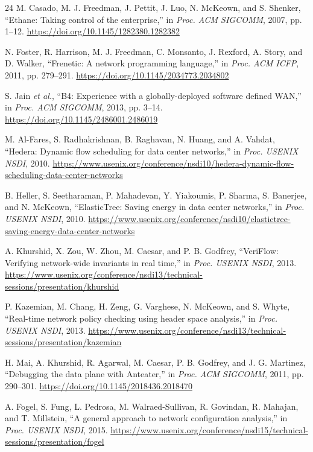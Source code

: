 \documentclass[conference]{IEEEtran}
\begin{document}
\begin{thebibliography}{24}
 M. Casado, M. J. Freedman, J. Pettit, J. Luo,
N. McKeown, and S. Shenker, ``Ethane: Taking control of the enterprise,''
in \emph{Proc. ACM SIGCOMM}, 2007, pp. 1--12.
\url{https://doi.org/10.1145/1282380.1282382}

 N. Foster, R. Harrison, M. J. Freedman,
C. Monsanto, J. Rexford, A. Story, and D. Walker, ``Frenetic: A network
programming language,'' in \emph{Proc. ACM ICFP}, 2011, pp. 279--291.
\url{https://doi.org/10.1145/2034773.2034802}

 S. Jain \emph{et al.}, ``B4: Experience with a
globally-deployed software defined WAN,'' in \emph{Proc. ACM SIGCOMM},
2013, pp. 3--14. \url{https://doi.org/10.1145/2486001.2486019}

 M. Al-Fares, S. Radhakrishnan, B. Raghavan,
N. Huang, and A. Vahdat, ``Hedera: Dynamic flow scheduling for data center
networks,'' in \emph{Proc. USENIX NSDI}, 2010.
\url{https://www.usenix.org/conference/nsdi10/hedera-dynamic-flow-scheduling-data-center-networks}

 B. Heller, S. Seetharaman, P. Mahadevan,
Y. Yiakoumis, P. Sharma, S. Banerjee, and N. McKeown, ``ElasticTree:
Saving energy in data center networks,'' in \emph{Proc. USENIX NSDI},
2010. \url{https://www.usenix.org/conference/nsdi10/elastictree-saving-energy-data-center-networks}

 A. Khurshid, X. Zou, W. Zhou, M. Caesar,
and P. B. Godfrey, ``VeriFlow: Verifying network-wide invariants in real
time,'' in \emph{Proc. USENIX NSDI}, 2013.
\url{https://www.usenix.org/conference/nsdi13/technical-sessions/presentation/khurshid}

 P. Kazemian, M. Chang, H. Zeng, G. Varghese,
N. McKeown, and S. Whyte, ``Real-time network policy checking using header
space analysis,'' in \emph{Proc. USENIX NSDI}, 2013.
\url{https://www.usenix.org/conference/nsdi13/technical-sessions/presentation/kazemian}

 H. Mai, A. Khurshid, R. Agarwal, M. Caesar,
P. B. Godfrey, and J. G. Martinez, ``Debugging the data plane with
Anteater,'' in \emph{Proc. ACM SIGCOMM}, 2011, pp. 290--301.
\url{https://doi.org/10.1145/2018436.2018470}

 A. Fogel, S. Fung, L. Pedrosa, M. Walraed-Sullivan,
R. Govindan, R. Mahajan, and T. Millstein, ``A general approach to network
configuration analysis,'' in \emph{Proc. USENIX NSDI}, 2015.
\url{https://www.usenix.org/conference/nsdi15/technical-sessions/presentation/fogel}


\end{thebibliography}
\end{document}
